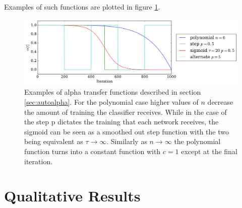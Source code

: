     Examples of such functions are plotted in figure \ref{fig:alpha_functions}.

    \begin{figure}[!h]
      \centering
      \includegraphics[width =\hsize]{figures/alpha.pdf}
      \caption{Examples of alpha transfer functions described in section \ref{sec:autoalpha}.
      For the polynomial case higher values of $n$ decrease the amount of training
      the classifier receives. While in the case of the step p dictates the training
      that each network receives, the sigmoid can be seen as a smoothed out step function
      with the two being equivalent as $ \tau \rightarrow \infty$. Similarly as $n \rightarrow \infty$
      the polynomial function turns into a constant function with $c=1$ except at the final
      iteration.}
      \label{fig:alpha_functions}
    \end{figure}

  \section{Qualitative Results}
